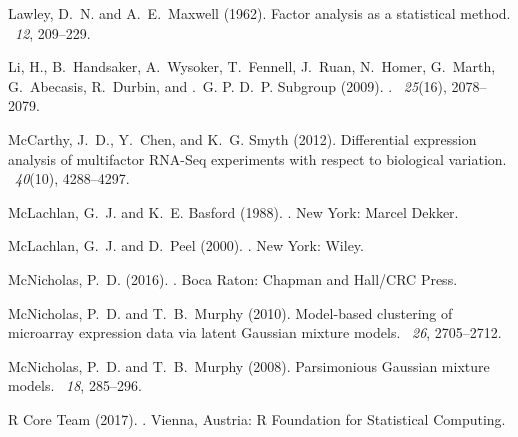 \documentclass[12pt]{article}
\begin{document}
{\begin{thebibliography}{}
Lawley, D.~N. and A.~E.~Maxwell (1962).
\newblock Factor analysis as a statistical method.
~{\em 12\/}, 209--229.

Li, H., B.~Handsaker, A.~Wysoker, T.~Fennell, J.~Ruan, N.~Homer, G.~Marth,
  G.~Abecasis, R.~Durbin, and .~G. P. D.~P. Subgroup (2009).
.
~{\em 25\/}(16), 2078--2079.

McCarthy, J.~D., Y.~Chen, and K.~G. Smyth (2012).
\newblock Differential expression analysis of multifactor {RNA-Seq} experiments
  with respect to biological variation.
~{\em 40\/}(10), 4288--4297.

McLachlan, G.~J. and K.~E. Basford (1988).
.
\newblock New York: Marcel Dekker.

McLachlan, G.~J. and D.~Peel (2000).
.
\newblock New York: Wiley.

McNicholas, P.~D. (2016).
.
\newblock Boca Raton: Chapman and Hall/CRC Press.

McNicholas, P.~D. and T.~B.~Murphy (2010).
\newblock Model-based clustering of microarray expression data via latent {G}aussian mixture models.
~{\em 26\/}, 2705--2712.

McNicholas, P.~D. and T.~B.~Murphy (2008).
\newblock Parsimonious {G}aussian mixture models.
~{\em 18\/}, 285--296.

{R Core Team} (2017).
.
\newblock Vienna, Austria: R Foundation for Statistical Computing.


\end{thebibliography}}
\end{document}
